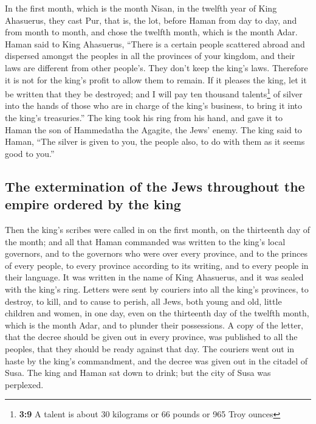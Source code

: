  In the first month, which is the month Nisan, in the
twelfth year of King Ahasuerus, they cast Pur, that is, the lot, before
Haman from day to day, and from month to month, and chose the twelfth
month, which is the month Adar.  Haman said to King
Ahasuerus, ``There is a certain people scattered abroad and dispersed
amongst the peoples in all the provinces of your kingdom, and their laws
are different from other people's. They don't keep the king's laws.
Therefore it is not for the king's profit to allow them to remain.
 If it pleases the king, let it be written that they be
destroyed; and I will pay ten thousand talents\footnote{\textbf{3:9} A
  talent is about 30 kilograms or 66 pounds or 965 Troy ounces} of
silver into the hands of those who are in charge of the king's business,
to bring it into the king's treasuries.''  The king took
his ring from his hand, and gave it to Haman the son of Hammedatha the
Agagite, the Jews' enemy.  The king said to Haman, ``The
silver is given to you, the people also, to do with them as it seems
good to you.''

\hypertarget{the-extermination-of-the-jews-throughout-the-empire-ordered-by-the-king}{%
\subsection{The extermination of the Jews throughout the empire ordered
by the
king}\label{the-extermination-of-the-jews-throughout-the-empire-ordered-by-the-king}}

 Then the king's scribes were called in on the first
month, on the thirteenth day of the month; and all that Haman commanded
was written to the king's local governors, and to the governors who were
over every province, and to the princes of every people, to every
province according to its writing, and to every people in their
language. It was written in the name of King Ahasuerus, and it was
sealed with the king's ring.  Letters were sent by
couriers into all the king's provinces, to destroy, to kill, and to
cause to perish, all Jews, both young and old, little children and
women, in one day, even on the thirteenth day of the twelfth month,
which is the month Adar, and to plunder their possessions.
 A copy of the letter, that the decree should be given
out in every province, was published to all the peoples, that they
should be ready against that day.  The couriers went out
in haste by the king's commandment, and the decree was given out in the
citadel of Susa. The king and Haman sat down to drink; but the city of
Susa was perplexed.

